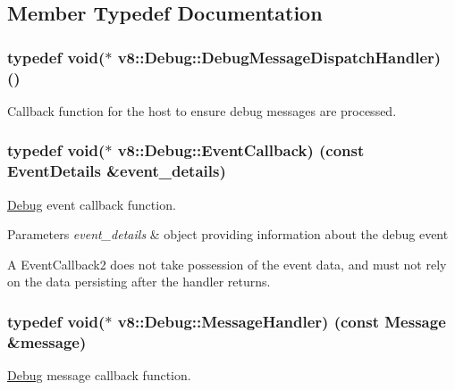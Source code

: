 \subsection{Member Typedef Documentation}
\hypertarget{classv8_1_1Debug_a91cd8aa9743e3478bc63fe73abcd557c}{}
\subsubsection[{Debug\+Message\+Dispatch\+Handler}]{\setlength{\rightskip}{0pt plus 5cm}typedef void($\ast$ v8\+::\+Debug\+::\+Debug\+Message\+Dispatch\+Handler) ()}\label{classv8_1_1Debug_a91cd8aa9743e3478bc63fe73abcd557c}
Callback function for the host to ensure debug messages are processed. \hypertarget{classv8_1_1Debug_ab53894746a21222796062f0e81ea28d8}{}
\subsubsection[{Event\+Callback}]{\setlength{\rightskip}{0pt plus 5cm}typedef void($\ast$ v8\+::\+Debug\+::\+Event\+Callback) (const {\bf Event\+Details} \&event\+\_\+details)}\label{classv8_1_1Debug_ab53894746a21222796062f0e81ea28d8}
\hyperlink{classv8_1_1Debug}{Debug} event callback function.


\begin{DoxyParams}{Parameters}
{\em event\+\_\+details} & object providing information about the debug event\\
\hline
\end{DoxyParams}
A Event\+Callback2 does not take possession of the event data, and must not rely on the data persisting after the handler returns. \hypertarget{classv8_1_1Debug_a526826b857bd3e3efa184e12bcebc694}{}
\subsubsection[{Message\+Handler}]{\setlength{\rightskip}{0pt plus 5cm}typedef void($\ast$ v8\+::\+Debug\+::\+Message\+Handler) (const {\bf Message} \&message)}\label{classv8_1_1Debug_a526826b857bd3e3efa184e12bcebc694}
\hyperlink{classv8_1_1Debug}{Debug} message callback function.


